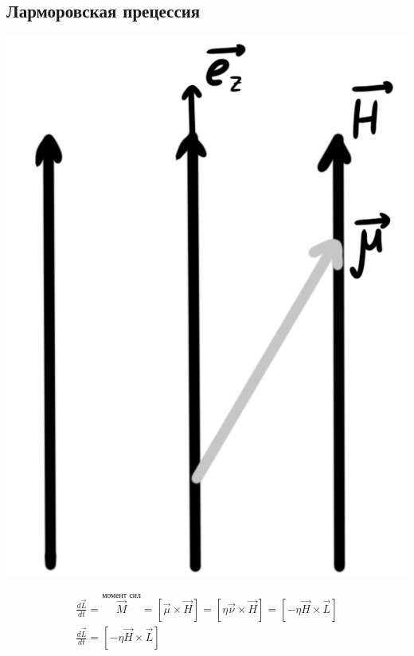\subsection*{Ларморовская прецессия}

\begin{minipage}[c]{0.2\textwidth} %
    \includegraphics[width=\textwidth]{im/76.png} %
\end{minipage}%
\hfill
\begin{minipage}[c]{0.6\textwidth} %
    \[
    \begin{aligned}
        \frac{d\vec{L}}{dt}=\overset{\text{момент сил}}{\vec{M}}=[\vec{\mu}\times \vec{H}]=[\eta\vec{\nu}\times \vec{H}]=[-\eta\vec{H}\times \vec{L}] \\
        \frac{d\vec{L}}{dt}=[-\eta\vec{H}\times \vec{L}]
    \end{aligned}
    \]
\end{minipage}


